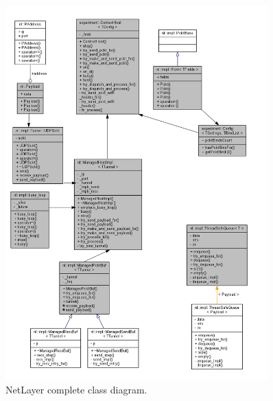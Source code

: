 \documentclass[11pt]{report}
\newcommand{\+}{\discretionary{\mbox{\scriptsize$\hookleftarrow$}}{}{}}
\begin{document}
                \begin{figure}[H]
                \caption{NetLayer complete class diagram.}
                \centering
                \includegraphics[width=0.9\textwidth]{d/coll/src.png}
                \end{figure}

                \newpage
\end{document}
